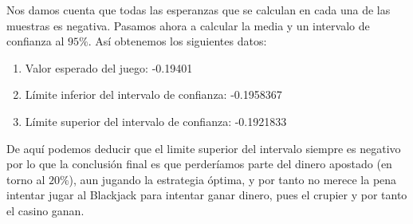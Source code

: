 \documentclass[12pt,a4paper,]{book}
\numberwithin{dummy}{section}
\theoremstyle{ocrenumbox}
\theoremstyle{blacknumex}
\theoremstyle{blacknumbox}
\theoremstyle{ocrenum}
\theoremstyle{ocrenum}
\begin{document}
Nos damos cuenta que todas las esperanzas que se calculan en cada una de
las muestras es negativa. Pasamos ahora a calcular la media y un
intervalo de confianza al \(95 \%\). Así obtenemos los siguientes datos:

\begin{enumerate}
\def\labelenumi{\arabic{enumi}.}
\item
  Valor esperado del juego: -0.19401
\item
  Límite inferior del intervalo de confianza: -0.1958367
\item
  Límite superior del intervalo de confianza: -0.1921833
\end{enumerate}

De aquí podemos deducir que el limite superior del intervalo siempre es
negativo por lo que la conclusión final es que perderíamos parte del
dinero apostado (en torno al \(20 \%\)), aun jugando la estrategia
óptima, y por tanto no merece la pena intentar jugar al Blackjack para
intentar ganar dinero, pues el crupier y por tanto el casino ganan.




%
\end{document}
